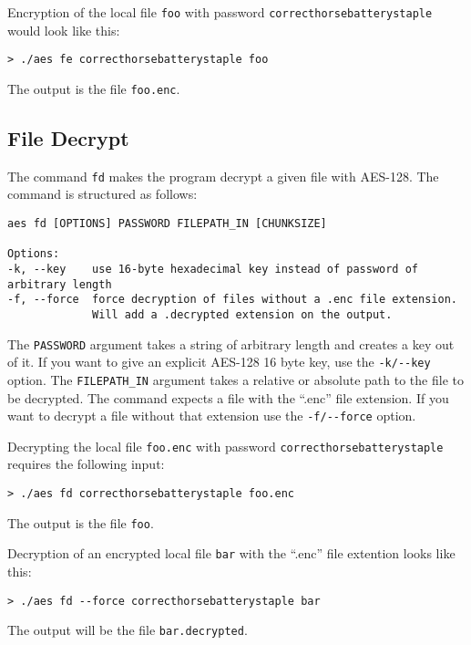 Encryption of the local file \lstinline|foo| with password \lstinline|correcthorsebatterystaple| would look like this:
\begin{lstlisting}
> ./aes fe correcthorsebatterystaple foo
\end{lstlisting}
The output is the file \lstinline|foo.enc|.


\subsection{File Decrypt}
The command \lstinline{fd} makes the program decrypt a given file with AES-128. The command is structured as follows:
\begin{lstlisting}
aes fd [OPTIONS] PASSWORD FILEPATH_IN [CHUNKSIZE]

Options:
-k, --key    use 16-byte hexadecimal key instead of password of arbitrary length
-f, --force  force decryption of files without a .enc file extension.
             Will add a .decrypted extension on the output.
\end{lstlisting}
The \lstinline{PASSWORD} argument takes a string of arbitrary length and creates a key out of it. If you want to give an explicit AES-128 16 byte key, use the \lstinline{-k/--key} option. The \lstinline{FILEPATH_IN} argument takes a relative or absolute path to the file to be decrypted. The command expects a file with the \enquote{.enc} file extension. If you want to decrypt a file without that extension use the \lstinline{-f/--force} option.

Decrypting the local file \lstinline|foo.enc| with password \lstinline|correcthorsebatterystaple| requires the following input:
\begin{lstlisting}
> ./aes fd correcthorsebatterystaple foo.enc
\end{lstlisting}
The output is the file \lstinline|foo|.

Decryption of an encrypted local file \lstinline|bar| with the \enquote{.enc} file extention looks like this:
\begin{lstlisting}
> ./aes fd --force correcthorsebatterystaple bar
\end{lstlisting}
The output will be the file \lstinline|bar.decrypted|.
